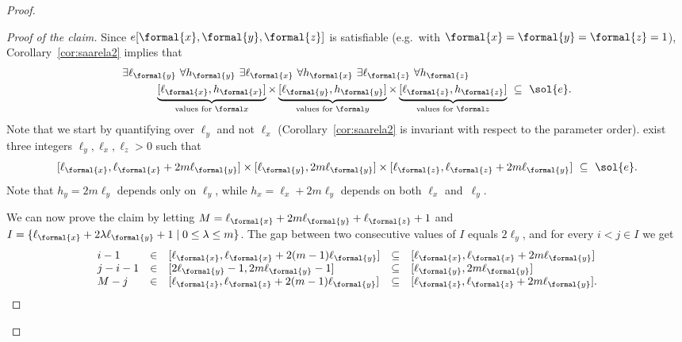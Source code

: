 \documentclass{article}
\begin{document}
\begin{proof}
\begin{proof}[Proof of the claim]
Since $e[\formal{x}, \formal{y}, \formal{z}]$ is satisfiable (e.g.~with
$\formal{x}=\formal{y}=\formal{z}=1$), Corollary~\ref{cor:saarela2}
implies that
\[
\begin{aligned}
  & \exists \ell_{\formal{y}} ~ \forall h_{\formal{y}} ~ 
  \exists \ell_{\formal{x}} ~ \forall h_{\formal{x}} ~ 
  \exists \ell_{\formal{z}} ~ \forall h_{\formal{z}} \\
  &\qquad\quad
  \underbrace{[\ell_{\formal{x}},h_{\formal{x}}]}_{\text{values for }\formal x} \times
  \underbrace{[\ell_{\formal{y}},h_{\formal{y}}]}_{\text{values for }\formal y} \times
  \underbrace{[\ell_{\formal{z}},h_{\formal{z}}]}_{\text{values for }\formal z} 
  ~\subseteq~ \sol{e}.
\end{aligned}
\]
Note that we start by quantifying over $\ell_y$ and not $\ell_x$
(Corollary~\ref{cor:saarela2} is invariant with respect to the
parameter order). %
exist three integers $\ell_y,\ell_x,\ell_z>0$ such that 
\begin{equation}\label{equ:solutionXYZ}
[\ell_{\formal{x}}, \ell_{\formal{x}} + 2m\ell_{\formal{y}}] \times
[\ell_{\formal{y}}, 2m \ell_{\formal{y}}] \times
[\ell_{\formal{z}}, \ell_{\formal{z}} + 2m \ell_{\formal{y}}]
  ~\subseteq~ \sol{e}.
\end{equation}
Note that $h_y = 2m\ell_y$ depends only on $\ell_y$, while
$h_x=\ell_x+2m\ell_y$ depends on both $\ell_x$ and~$\ell_y$. 

We can now prove the claim by letting 
$M = \ell_{\formal{x}} + 2m\ell_{\formal{y}} + \ell_{\formal{z}} + 1$ and 
$I = \{\ell_{\formal{x}} + 2\lambda\ell_{\formal{y}} + 1 \mid 0 \leq \lambda \leq m\}$.
The gap between two consecutive values of $I$ equals $2\ell_y$,
and for every $i < j\in I$ we get
\[
\begin{array}{lllll}
    i-1 & \in &
  [\ell_{\formal{x}},\ell_{\formal{x}}+2(m-1)\ell_{\formal{y}}] & \subseteq &
  [\ell_{\formal{x}}, \ell_{\formal{x}} + 2m\ell_{\formal{y}}] \\
  j-i-1 & \in & [2\ell_{\formal{y}}-1,2m\ell_{\formal{y}}-1] & \subseteq &
  [\ell_{\formal{y}},2m\ell_{\formal{y}}] \\
  M-j & \in &
  [\ell_{\formal{z}}, \ell_{\formal{z}} + 2(m-1)\ell_{\formal{y}}] & \subseteq &
  [\ell_{\formal{z}}, \ell_{\formal{z}} + 2m \ell_{\formal{y}}].
\end{array}
\]


\end{proof}
\end{proof}
\end{document}

